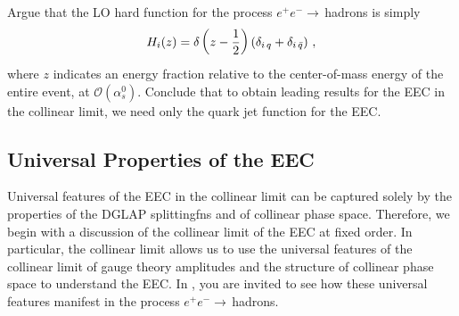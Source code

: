 \begin{exercise}
    \label{ex:ee-hard-function}
    Argue that the LO hard function for the process \(e^+ e^- \to\,\)hadrons is simply
    \begin{align}
        H_i(z)
        =
        \delta\left(z - \frac{1}{2}\right)
        \left(\delta_{i\,q} + \delta_{i\,\bar{q}}\right)
        \,,
    \end{align}
    where \(z\) indicates an energy fraction relative to the center-of-mass energy of the entire event, at \(\mathcal{O}(\alpha_s^0)\).
    Conclude that to obtain leading results for the EEC in the collinear limit, we need only the quark jet function for the EEC.
\end{exercise}







\subsection{Universal Properties of the EEC}
\label{sec:eec-universal}

Universal features of the EEC in the collinear limit can be captured solely by the properties of the DGLAP \glspl{splittingfn} and of collinear phase space.
%
Therefore, we begin with a discussion of the collinear limit of the EEC at fixed order.
%
In particular, the collinear limit allows us to use the universal features of the collinear limit of gauge theory amplitudes and the structure of collinear phase space to understand the EEC.
%
In , you are invited to see how these universal features manifest in the process \(e^+ e^-\to\,\)hadrons.

